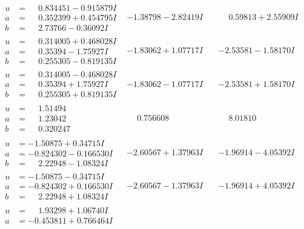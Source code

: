 \documentclass[1p]{elsarticle_modified}
\theoremstyle{definition}
\begin{document}
$$\begin{array}{c|c|c}
 \hline 
\begin{aligned}
u &= \phantom{-}0.834451 - 0.915879 I \\
a &= \phantom{-}0.352399 + 0.454795 I \\
b &= \phantom{-}2.73766 - 0.36092 I\end{aligned}
 & -1.38798 - 2.82419 I & \phantom{-}0.59813 + 2.55909 I \\ \hline\begin{aligned}
u &= \phantom{-}0.314005 + 0.468028 I \\
a &= \phantom{-}0.35394 - 1.75927 I \\
b &= \phantom{-}0.255305 - 0.819135 I\end{aligned}
 & -1.83062 + 1.07717 I & -2.53581 - 1.58170 I \\ \hline\begin{aligned}
u &= \phantom{-}0.314005 - 0.468028 I \\
a &= \phantom{-}0.35394 + 1.75927 I \\
b &= \phantom{-}0.255305 + 0.819135 I\end{aligned}
 & -1.83062 - 1.07717 I & -2.53581 + 1.58170 I \\ \hline\begin{aligned}
u &= \phantom{-}1.51494\phantom{ +0.000000I} \\
a &= \phantom{-}1.23042\phantom{ +0.000000I} \\
b &= \phantom{-}0.320247\phantom{ +0.000000I}\end{aligned}
 & \phantom{-}0.756608\phantom{ +0.000000I} & \phantom{-}8.01810\phantom{ +0.000000I} \\ \hline\begin{aligned}
u &= -1.50875 + 0.34715 I \\
a &= -0.824302 - 0.166530 I \\
b &= \phantom{-}2.22948 - 1.08324 I\end{aligned}
 & -2.60567 + 1.37963 I & -1.96914 - 4.05392 I \\ \hline\begin{aligned}
u &= -1.50875 - 0.34715 I \\
a &= -0.824302 + 0.166530 I \\
b &= \phantom{-}2.22948 + 1.08324 I\end{aligned}
 & -2.60567 - 1.37963 I & -1.96914 + 4.05392 I \\ \hline\begin{aligned}
u &= \phantom{-}1.93298 + 1.06740 I \\
a &= -0.453811 + 0.766464 I \\

\end{aligned}
\end{array}$$
\end{document}
